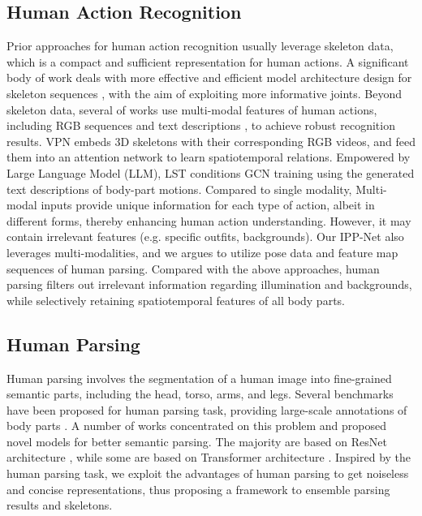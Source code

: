 \documentclass[runningheads]{llncs}
\begin{document}
\subsection{Human Action Recognition}
Prior approaches for human action recognition usually leverage skeleton data, which is a compact and sufficient representation for human actions. A significant body of work deals with more effective and efficient model architecture design for skeleton sequences \cite{dstanet2020,shiftgcn2020,dynamicgcn2020,CTR-GCN2021,Chi_2022_CVPR,gsgcn2022,psumnet2023,STSAnet2023,wen2023interactive}, with the aim of exploiting more informative joints. Beyond skeleton data, several of works use multi-modal features of human actions, including RGB sequences \cite{vpn2020} and text descriptions \cite{LST2022}, to achieve robust recognition results. VPN \cite{vpn2020} embeds 3D skeletons with their corresponding RGB videos, and feed them into an attention network to learn spatiotemporal relations. Empowered by Large Language Model (LLM), LST \cite{LST2022} conditions GCN training using the generated text descriptions of body-part motions. Compared to single modality, Multi-modal inputs provide unique information for each type of action, albeit in different forms, thereby enhancing human action understanding. However, it may contain irrelevant features (e.g. specific outfits, backgrounds). Our IPP-Net also leverages multi-modalities, and we argues to utilize pose data and feature map sequences of human parsing. Compared with the above approaches, human parsing filters out irrelevant information regarding illumination and backgrounds, while selectively retaining spatiotemporal features of all body parts.

\subsection{Human Parsing}
Human parsing involves the segmentation of a human image into fine-grained semantic parts, including the head, torso, arms, and legs. Several benchmarks have been proposed for human parsing task, providing large-scale annotations of body parts \cite{ATR,LIP2019}. A number of works concentrated on this problem and proposed novel models for better semantic parsing. The majority are based on ResNet architecture \cite{LIP2019,ruan2019devil,Zhao_2017_CVPR,li2020self}, while some are based on 
Transformer architecture \cite{Chen_2023_CVPR}. Inspired by the human parsing task, we exploit the advantages of human parsing to get noiseless and concise representations, thus proposing a framework to ensemble parsing results and skeletons.
\end{document}
